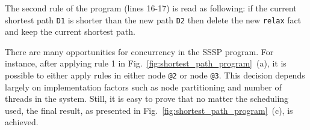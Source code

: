 The second rule of the program (lines 16-17) is read as following: if the
current shortest path \texttt{D1} is shorter than the new path \texttt{D2} then
delete the new \texttt{relax} fact and keep the current shortest path.

There are many opportunities for concurrency in the SSSP program. For instance,
after applying rule 1 in Fig.~\ref{fig:shortest_path_program}~(a), it is
possible to either apply rules in either node \texttt{@2} or node
\texttt{@3}. This decision depends largely on implementation factors such
as node partitioning and number of threads in the system.  Still, it is
easy to prove that no matter the scheduling used, the final result, as
presented in Fig.~\ref{fig:shortest_path_program}~(c), is achieved.

